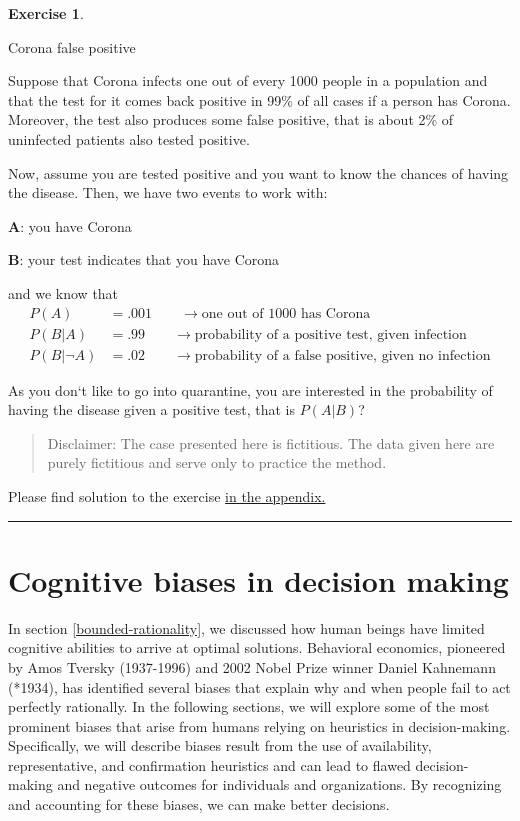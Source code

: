 \documentclass[
  12pt,
  oneside]{book}
\theoremstyle{definition}
\theoremstyle{definition}
\theoremstyle{definition}
\newtheorem{exercise}{Exercise}[chapter]
\theoremstyle{definition}
\theoremstyle{remark}
\begin{document}
\begin{exercise}
\protect\hypertarget{exr:falspos}{}\label{exr:falspos}

Corona false positive

Suppose that Corona infects one out of every 1000 people in a population and that the test for it comes back positive in 99\% of all cases if a person has Corona. Moreover, the test also produces some false positive, that is about 2\% of uninfected patients also tested positive.

Now, assume you are tested positive and you want to know the chances of having the disease.
Then, we have two events to work with:

\textbf{A}: you have Corona

\textbf{B}: your test indicates that you have Corona

and we know that
\begin{align*}
    P(A)&=.001  \qquad \rightarrow \text{one out of 1000 has Corona}\\
    P(B|A)&=.99 \qquad \rightarrow \text{probability of a positive test, given infection}\\
    P(B|\neg A)&=.02 \qquad \rightarrow \text{probability of a false positive, given no infection}
\end{align*}

As you don`t like to go into quarantine, you are interested in the probability of having the disease given a positive test, that is \(P(A|B)\)?

\begin{quote}
Disclaimer: The case presented here is fictitious. The data given here are purely fictitious and serve only to practice the method.
\end{quote}

Please find solution to the exercise \protect\hyperlink{sol:falspos}{in the appendix.}

\begin{center}\rule{0.5\linewidth}{0.5pt}\end{center}

\end{exercise}

\hypertarget{cognitive-biases}{%
\section{Cognitive biases in decision making}\label{cognitive-biases}}

In section \ref{bounded-rationality}, we discussed how human beings have limited cognitive abilities to arrive at optimal solutions. Behavioral economics, pioneered by Amos Tversky (1937-1996) and 2002 Nobel Prize winner Daniel Kahnemann (*1934), has identified several biases that explain why and when people fail to act perfectly rationally. In the following sections, we will explore some of the most prominent biases that arise from humans relying on heuristics in decision-making. Specifically, we will describe biases result from the use of availability, representative, and confirmation heuristics and can lead to flawed decision-making and negative outcomes for individuals and organizations. By recognizing and accounting for these biases, we can make better decisions.
\end{document}
